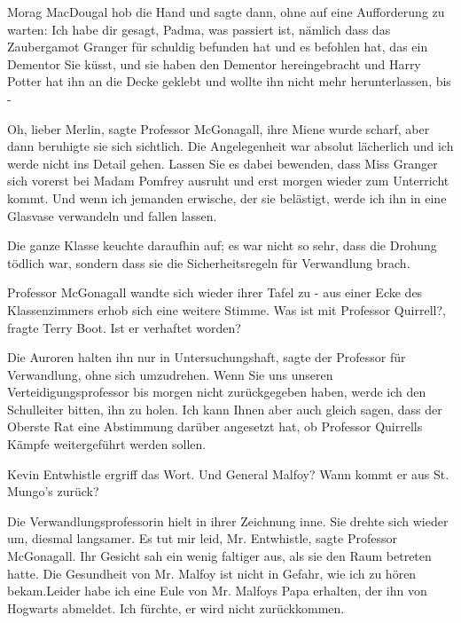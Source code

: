 Morag MacDougal hob die Hand und sagte dann, ohne auf eine Aufforderung zu
warten: \glqq{}Ich habe dir gesagt, Padma, was passiert ist, nämlich dass das
Zaubergamot Granger für schuldig befunden hat und es befohlen hat, das ein
Dementor Sie küsst, und sie haben den Dementor hereingebracht und Harry Potter
hat ihn an die Decke geklebt und wollte ihn nicht mehr herunterlassen, bis
-\grqq{}

\glqq{}Oh, lieber Merlin\grqq{}, sagte Professor McGonagall, ihre Miene wurde
scharf, aber dann beruhigte sie sich sichtlich. \glqq{}Die Angelegenheit war
absolut lächerlich und ich werde nicht ins Detail gehen. Lassen Sie es dabei
bewenden, dass Miss Granger sich vorerst bei Madam Pomfrey ausruht und erst
morgen wieder zum Unterricht kommt. Und wenn ich jemanden erwische, der sie
belästigt, werde ich ihn in eine Glasvase verwandeln und fallen lassen.\grqq{}

Die ganze Klasse keuchte daraufhin auf; es war nicht so sehr, dass die Drohung
tödlich war, sondern dass sie die Sicherheitsregeln für Verwandlung brach.

Professor McGonagall wandte sich wieder ihrer Tafel zu - aus einer Ecke des
Klassenzimmers erhob sich eine weitere Stimme. \glqq{}Was ist mit Professor
Quirrell?\grqq{}, fragte Terry Boot. \glqq{}Ist er verhaftet worden?\grqq{}

\glqq{}Die Auroren halten ihn nur in Untersuchungshaft\grqq{}, sagte der
Professor für Verwandlung, ohne sich umzudrehen. \glqq{}Wenn Sie uns unseren
Verteidigungsprofessor bis morgen nicht zurückgegeben haben, werde ich den
Schulleiter bitten, ihn zu holen. Ich kann Ihnen aber auch gleich sagen, dass
der Oberste Rat eine Abstimmung darüber angesetzt hat, ob Professor Quirrells
Kämpfe weitergeführt werden sollen.\grqq{}

Kevin Entwhistle ergriff das Wort. \glqq{}Und General Malfoy? Wann kommt er aus
St. Mungo's zurück?\grqq{}

Die Verwandlungsprofessorin hielt in ihrer Zeichnung inne. Sie drehte sich
wieder um, diesmal langsamer. \glqq{}Es tut mir leid, Mr. Entwhistle\grqq{},
sagte Professor McGonagall. Ihr Gesicht sah ein wenig faltiger aus, als sie den
Raum betreten hatte. \glqq{}Die Gesundheit von Mr. Malfoy ist nicht in Gefahr,
wie ich zu hören bekam.Leider habe ich eine Eule von Mr. Malfoys Papa erhalten,
der ihn von Hogwarts abmeldet. Ich fürchte, er wird nicht zurückkommen.\grqq{}

